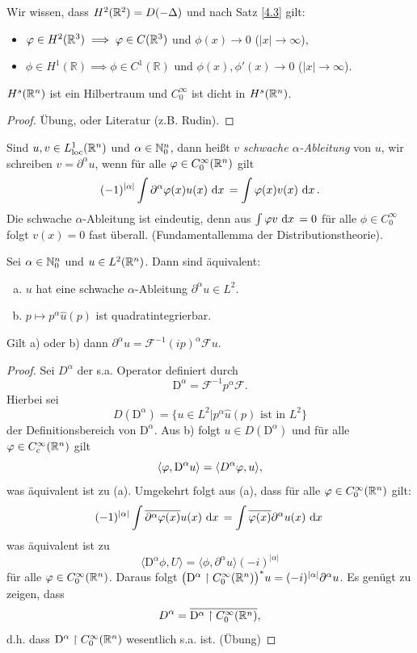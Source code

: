 \documentclass{mycourse}
\begin{document}
\begin{ex*}
Wir wissen, dass $H^2(\mathbb{R}^2)=D(-\Delta)$ und nach Satz \ref{4.3} gilt:
\begin{itemize}
\item $\varphi \in H^2(\mathbb{R}^3) \implies \varphi \in C(\mathbb{R}^3)$ und $\phi(x)\to 0$ ($|x|\to \infty$),
\item $\phi \in H^1(\mathbb R)\implies \phi \in C^1(\mathbb R)$ und $\phi(x), \phi'(x)\to 0$ ($|x|\to \infty$).
\end{itemize}
\end{ex*}


\begin{st} 
$H^s(\mathbb{R}^n)$ ist ein Hilbertraum und $C_0^\infty$ ist dicht in $H^s(\mathbb{R}^n)$.
\end{st}
\begin{proof}
Übung, oder Literatur (z.B. Rudin).
\end{proof}
\begin{df}
Sind $u,v\in L^1_{\text{loc}}(\mathbb{R}^n)$ und $\alpha \in \mathbb{N}_0^n$, dann heißt $v$ \emph{schwache $\alpha$-Ableitung} von $u$, wir schreiben $v=\partial^\alpha u$, wenn für alle $\varphi \in C_0^\infty (\mathbb{R}^n)$ gilt
\[
(-1)^{|\alpha|} \int \partial^\alpha \varphi(x) u(x) \, \,\mathrm{d}x\, = \int \varphi(x) v(x) \, \,\mathrm{d}x\,.
\] 
Die schwache $\alpha$-Ableitung ist eindeutig, denn aus $\int \varphi v \, \,\mathrm{d}x\,=0$ für alle $\phi \in C_0^\infty$ folgt $v(x)=0$ fast überall. (Fundamentallemma der Distributionstheorie).
\end{df}

\begin{st}\label{5.5}
Sei $\alpha\in \mathbb{N}_0^n$ und $u\in L^2(\mathbb{R}^n)$. Dann sind äquivalent:
\begin{enumerate}[a)]
\item$u$ hat eine schwache $\alpha$-Ableitung $\partial^\alpha u\in L^2$.
\item $p \mapsto p^\alpha \hat u(p)$ ist quadratintegrierbar.
\end{enumerate}
Gilt a) oder b) dann $\partial^\alpha u = \mathcal F^{-1} (ip)^\alpha \mathcal Fu$.
\end{st}
\begin{proof}
Sei $D^\alpha$ der s.a. Operator definiert durch
\[
\mathrm D^\alpha = \mathcal F^{-1} p^\alpha \mathcal F.
\]
Hierbei sei 
\[
D(\mathrm D^\alpha) = \{ u \in L^2| p^{\alpha} \hat u(p) \text{ ist in } L^2\}
\]
der Definitionsbereich von $\mathrm D^\alpha$. Aus b) folgt $u\in D(\mathrm D^\alpha)$ und für alle $\varphi \in C_c^\infty(\mathbb{R}^n)$ gilt
\[
\langle \varphi, \mathrm D^\alpha u\rangle= \langle D^\alpha \varphi, u\rangle,
\]
was äquivalent ist zu (a). Umgekehrt folgt aus (a), dass für alle $\varphi \in C_0^\infty(\mathbb{R}^n)$ gilt:
\[
(-1)^{|\alpha|} \int \overline{\partial^\alpha \varphi(x)} u(x) \, \,\mathrm{d}x\, = \int \overline{\varphi(x)} \partial^\alpha u(x) \, \,\mathrm{d}x\,
\]
was äquivalent ist zu
\[
\langle \mathrm D^\alpha \phi, U \rangle = \langle \phi, \partial^\alpha u \rangle (-i)^{|\alpha|}
\]
für alle $\varphi \in C_0^\infty(\mathbb{R}^n)$. Daraus folgt
$\big(\mathrm D^\alpha\upharpoonright C_0^\infty(\mathbb{R}^n)\big)^*u= (-i)^{|\alpha|} \partial^\alpha u$. Es genügt zu zeigen, dass
\[
D^\alpha = \overline{\mathrm D^\alpha \upharpoonright C_0^\infty(\mathbb{R}^n)},
\]
d.h. dass $\mathrm D^\alpha \upharpoonright C_0^\infty(\mathbb{R}^n)$ wesentlich s.a. ist. (Übung)
\end{proof}
\end{document}
